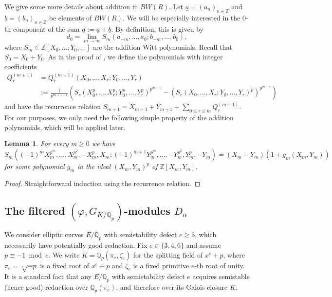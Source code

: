 \documentclass{amsart}
\newcommand{\Qp}{\mathbb{Q}_p}
\newtheorem{lemma}[theorem]{Lemma}
\theoremstyle{definition}
\newcommand{\Q}{\mathbb{Q}}
\numberwithin{theorem}{section}
\numberwithin{equation}{section}
\begin{document}
We give some more details about addition in $BW(R)$. Let $\underline{a} =(a_n)_{n \in \mathbb{Z}}$ and $\underline{b}=(b_n)_{n \in \mathbb{Z}}$ be elements of $BW(R)$. We will be especially interested in the $0$-th component of the sum $\underline{d} := \underline{a} + \underline{b}$. By definition, this is given by
\[
d_0 = \lim_{m \to \infty} S_m(a_{-m},\ldots,a_0;b_{-m},\ldots,b_0),
\]
where $S_m \in \mathbb{Z}[X_0,\ldots;Y_0,\ldots]$ are the addition Witt polynomials. Recall that $S_0 = X_0 + Y_0$.
As in the proof of \cite[Lemme 2 on p.~123]{Volkov}, we define the polynomials with integer coefficients
\begin{equation*}
\begin{aligned}
Q_r^{(m+1)} & = Q_r^{(m+1)}(X_0,\ldots,X_r;Y_0,\ldots,Y_r) \\
& := \frac{1}{p^{m+1-r}}(S_r(X_0^p,\ldots,X_r^p;Y_0^p,\ldots,Y_r^p)^{p^{m-r}} - (S_r(X_0,\ldots,X_r;Y_0,\ldots,Y_r)^p)^{p^{m-r}})
\end{aligned}
\end{equation*}
and have the recurrence relation $S_{m+1} = X_{m+1} + Y_{m+1} + \sum_{0 \leq r \leq m} Q_r^{(m+1)}.$ For our purposes, we only need the following simple property of the addition polynomials, which will be applied later. 

\begin{lemma}\label{lemma: addition polynomials in one variable}
For every $m \geq 0$ we have
    \[
S_m((-1)^mX_m^{p^m} , \ldots, X_m^{p^2}, -X_m^p, X_m; (-1)^{m+1}Y_m^{p^m} , \ldots, -Y_m^{p^2}, Y_m^p, -Y_m) = (X_m-Y_m)(1 + g_m(X_m, Y_m))
\]
for some polynomial $g_m$ in the ideal $(X_m, Y_m)^p$ of $\mathbb{Z}[X_m, Y_m]$.
\end{lemma}

\begin{proof}
    Straightforward induction using the recurrence relation.
\end{proof}

\subsection{The filtered $(\varphi, G_{K/\mathbb{Q}_p})$-modules $D_\alpha$}\label{sect: filtred phi modules}

We consider elliptic curves $E/\mathbb{Q}_p$ with semistability defect $e \geq 3$, which necessarily have potentially good reduction.  Fix $e \in \{3,4,6\}$ and assume $p \equiv -1 \bmod{e}$. We write $K=\Qp(\pi_e,\zeta_e)$ for the splitting field of $x^e+p$, where $\pi_e=\sqrt[e]{-p}$ is a fixed root of $x^e+p$ and $\zeta_e$ is a fixed primitive $e$-th root of unity. It is a standard fact that any $E/\Q_p$ with semistability defect $e$ acquires semistable (hence good) reduction over $\Qp(\pi_e)$, and therefore over its Galois closure $K$.
\end{document}
